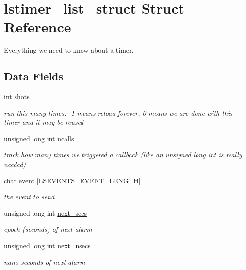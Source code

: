 \hypertarget{structlstimer__list__struct}{\section{lstimer\-\_\-list\-\_\-struct Struct Reference}
\label{structlstimer__list__struct}
}


Everything we need to know about a timer.  


\subsection*{Data Fields}
\begin{DoxyCompactItemize}
\item 
int \hyperlink{structlstimer__list__struct_ac7ab4cd1f3065156f95b49e66bf05283}{shots}
\begin{DoxyCompactList}\small\item\em run this many times\-: -\/1 means reload forever, 0 means we are done with this timer and it may be reused \end{DoxyCompactList}\item 
unsigned long int \hyperlink{structlstimer__list__struct_aa56c5b8ce7fa0ae93132cb9908195836}{ncalls}
\begin{DoxyCompactList}\small\item\em track how many times we triggered a callback (like an unsigned long int is really needed) \end{DoxyCompactList}\item 
char \hyperlink{structlstimer__list__struct_a54d564e392315b2730278bb925803184}{event} \mbox{[}\hyperlink{pgpmac_8h_ab61d790b5572f116e091babfda53627b}{L\-S\-E\-V\-E\-N\-T\-S\-\_\-\-E\-V\-E\-N\-T\-\_\-\-L\-E\-N\-G\-T\-H}\mbox{]}
\begin{DoxyCompactList}\small\item\em the event to send \end{DoxyCompactList}\item 
unsigned long int \hyperlink{structlstimer__list__struct_af0dcaad37472462c9f27d54ed0ceb75d}{next\-\_\-secs}
\begin{DoxyCompactList}\small\item\em epoch (seconds) of next alarm \end{DoxyCompactList}\item 
unsigned long int \hyperlink{structlstimer__list__struct_ab115115d5be7933f98a094b46b6583bb}{next\-\_\-nsecs}
\begin{DoxyCompactList}\small\item\em nano seconds of next alarm \end{DoxyCompactList}\item 

\end{DoxyCompactItemize}

